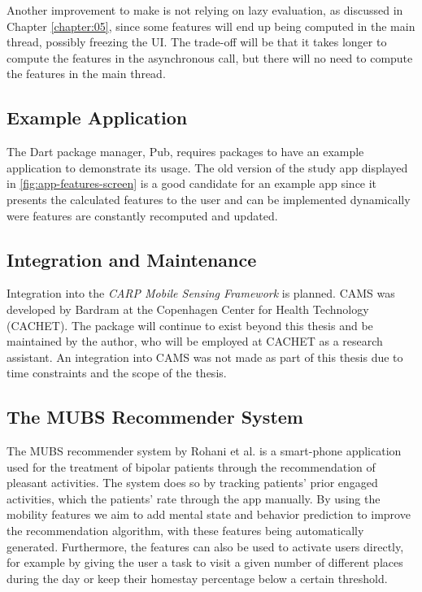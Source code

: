 Another improvement to make is not relying on lazy evaluation, as discussed in Chapter \ref{chapter:05}, since some features will end up being computed in the main thread, possibly freezing the UI. The trade-off will be that it takes longer to compute the features in the asynchronous call, but there will no need to compute the features in the main thread.

\subsection{Example Application}
The Dart package manager, Pub, requires packages to have an example application to demonstrate its usage. The old version of the study app displayed in \ref{fig:app-features-screen} is a good candidate for an example app since it presents the calculated features to the user and can be implemented dynamically were features are constantly recomputed and updated.

\subsection{Integration and Maintenance}
Integration into the \textit{CARP Mobile Sensing Framework} is planned. CAMS was developed by Bardram \cite{CAMS} at the Copenhagen Center for Health Technology (CACHET). The package will continue to exist beyond this thesis and be maintained by the author, who will be employed at CACHET as a research assistant. An integration into CAMS was not made as part of this thesis due to time constraints and the scope of the thesis. \\

\subsection{The MUBS Recommender System}
The MUBS recommender system by Rohani et al. \cite{mubs-rohani} is a smart-phone application used for the treatment of bipolar patients through the recommendation of pleasant activities. The system does so by tracking patients' prior engaged activities, which the patients' rate through the app manually. By using the mobility features we aim to add mental state and behavior prediction to improve the recommendation algorithm, with these features being automatically generated. Furthermore, the features can also be used to activate users directly, for example by giving the user a task to visit a given number of different places during the day or keep their homestay percentage below a certain threshold.